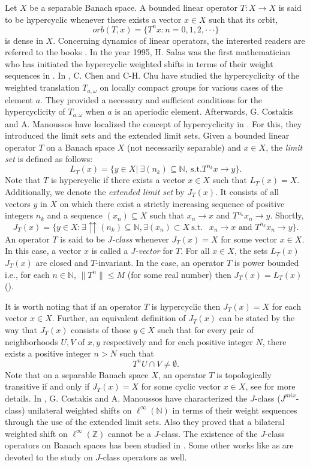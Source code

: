 \documentclass{amsart}
\theoremstyle{definition}\newtheorem{defn}[thm]{Definition}
\theoremstyle{remark}
\numberwithin{equation}{section}
\begin{document}
Let $X$ be a separable Banach space. A bounded linear operator $T:
X\rightarrow X$ is said to be hypercyclic whenever there exists a
vector $x\in X$ such that its orbit, $$orb(T,x)=\{T^nx:
n=0,1,2,\cdot\cdot\cdot\}$$ is dense in $X$. Concerning dynamics of
linear operators, the interested readers are referred to the books
\cite{baya, gros}.  In the year 1995, H. Salas was the first
mathematician who has initiated the hypercyclic weighted shifts in
terms of their weight sequences in \cite{sal}. In \cite{chen},  C.
Chen and C-H. Chu have studied the hypercyclicity of the weighted
translation $T_{a, \omega}$ on locally compact groups for various
cases of the element $a$. They provided a necessary and sufficient
conditions for the hypercyclicity of $T_{a, \omega}$ when $a$ is an
aperiodic element. Afterwards,   G. Costakis and  A. Manoussos have
localized the concept of hypercyclicity in \cite{cos}. For this,
they introduced the limit sets and the extended limit sets. Given a
bounded linear operator $T$ on a Banach space $X$ (not necessarily
separable) and $x\in X$, the \emph{limit set} is defined as follows:
$$L_T(x)=\{y\in X | ~ \exists (n_k) \subseteq \mathbb{N},~
\text{s.t.} T^{n_k} x \to y \}.$$
 Note that $ T $ is hypercyclic if there exists a vector
$ x \in X $ such that $L_T(x)=X$.  Additionally, we denote the
\emph{extended limit set} by $ J_T(x) $. It
 consists of all vectors $y$ in $X$ on which there exist a strictly increasing
  sequence of positive integers ${n_k}$ and a sequence $(x_n)\subseteq X$ such that
   $x_n \to x$  and $T^{n_k} x_n \to y$.  Shortly,
  \[
   J_T(x) = \{ y \in X :\exists \upuparrows(n_k) \subseteq \mathbb{N},   \exists (x_n)
   \subset X ~ \text{s.t. }~ ~ x_n \to x \text{ and } T^{n_k} x_n \to y \}
   .\]
An operator $ T $ is said to be  \textit{J-class } whenever $ J_T(x)
= X $ for some vector $x\in X$. In this case, a vector $ x $ is
called a \textit{J-vector} for $ T $. For all $x\in X$, the sets $
L_T(x)$  $ J_T(x)$ are  closed and $T$-invariant. In the case, an
operator $T$ is power bounded i.e., for each $n\in \mathbb{N}$,
$\|T^n\|\leq M$ (for some real number) then $ J_T(x)=L_T(x)$
(\cite{man}).


 It is worth noting that if an
operator $T$ is hypercyclic then $ J_T(x) = X $ for each vector
$x\in X$. Further,  an equivalent definition of $J_{T}(x)$ can be
stated by the way that $J_{T}(x)$ consists of those $y\in X$ such
that for every pair of neighborhoods $ U, V $ of $ x, y$
respectively and for each positive integer $N$, there exists a
positive integer $ n> N$ such that $$T^n U \cap V\neq \emptyset.$$
Note that on a separable Banach space $X$, an operator $T$ is
topologically transitive if and only if $J_{T}(x)=X$ for some cyclic
vector $x\in X$, see \cite{man} for more details. In \cite{cos}, G.
Costakis and A. Manoussos have characterized the $J$-class
($J^{mix}$- class) unilateral weighted shifts on
$\ell^{\infty}(\mathbb{N})$ in terms of their weight sequences
through the use of the extended limit sets. Also they proved that a
bilateral weighted shift on $\ell^{\infty}(\mathbb{Z})$ cannot be a
$J$-class. The existence of the $J$-class operators on Banach spaces
has been studied in \cite{nas2}. Some other works like as \cite{as,
az3, azmu, mar} are devoted to the study on $J$-class operators as
well.
\end{document}
